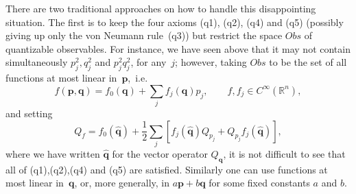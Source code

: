 \documentclass[12pt]{amsart}
\numberwithin{equation}{section}
\theoremstyle{remark}
\newcommand\Obs{Obs}
\newcommand\RR{\mathbb R}
\newcommand{\bp}{\mathbf p}
\newcommand{\bq}{\mathbf q}
\begin{document}
There are two traditional approaches on how to handle this disappointing
situation. The first is to keep the four axioms (q1), (q2), (q4) and (q5)
(possibly giving up only the von Neumann rule~(q3)) but restrict the space
$\Obs$ of quantizable observables. For instance, we have seen above that it may
not contain simultaneously $p_j^2,q_j^2$ and $p_j^2 q_j^2$, for any~$j$;
however, taking $\Obs$ to be the set of all functions at most linear
in~$\bp$,~i.e.
$$ f(\bp,\bq) = f_0(\bq) + \sum_j f_j(\bq) p_j, \qquad
 f,f_j\in C^\infty(\RR^n), $$
and setting
$$ Q_f = f_0(\widehat{\bq} ) + \frac12 \sum_j [ f_j(\widehat{\bq}) Q_{p_j} +
 Q_{p_j} f_j(\widehat{\bq}) ],  $$
where we have written $\widehat{\bq}$ for the vector operator $Q_\bq$,
it is not difficult to see that all of (q1),(q2),(q4) and (q5) are satisfied.
Similarly one can use functions at most linear in~$\bq$, or, more generally, in
$a\bp+b\bq$ for some fixed constants $a$ and $b$.
\end{document}
